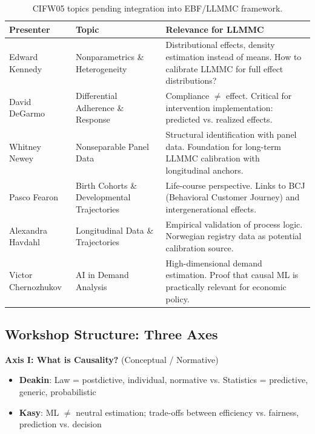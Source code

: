 \begin{table}[h]
\centering
\small
\begin{tabular}{p{3cm}p{4cm}p{6cm}}
\toprule
\textbf{Presenter} & \textbf{Topic} & \textbf{Relevance for LLMMC} \\
\midrule
Edward Kennedy & Nonparametrics \& Heterogeneity &
Distributional effects, density estimation instead of means.
How to calibrate LLMMC for full effect distributions? \\[0.5em]

David DeGarmo & Differential Adherence \& Response &
Compliance $\neq$ effect. Critical for intervention
implementation: predicted vs. realized effects. \\[0.5em]

Whitney Newey & Nonseparable Panel Data &
Structural identification with panel data. Foundation for
long-term LLMMC calibration with longitudinal anchors. \\[0.5em]

Pasco Fearon & Birth Cohorts \& Developmental Trajectories &
Life-course perspective. Links to BCJ (Behavioral Customer Journey)
and intergenerational effects. \\[0.5em]

Alexandra Havdahl & Longitudinal Data \& Trajectories &
Empirical validation of process logic. Norwegian registry data
as potential calibration source. \\[0.5em]

Victor Chernozhukov & AI in Demand Analysis &
High-dimensional demand estimation. Proof that causal ML
is practically relevant for economic policy. \\
\bottomrule
\end{tabular}
\caption{CIFW05 topics pending integration into EBF/LLMMC framework.}
\label{tab:cifw05-pending}
\end{table}

\subsection{Workshop Structure: Three Axes}

\textbf{Axis I: What is Causality?} (Conceptual / Normative)
\begin{itemize}[nosep]
\item \textbf{Deakin}: Law = postdictive, individual, normative vs.
Statistics = predictive, generic, probabilistic
\item \textbf{Kasy}: ML $\neq$ neutral estimation; trade-offs between
efficiency vs. fairness, prediction vs. decision
\end{itemize}

